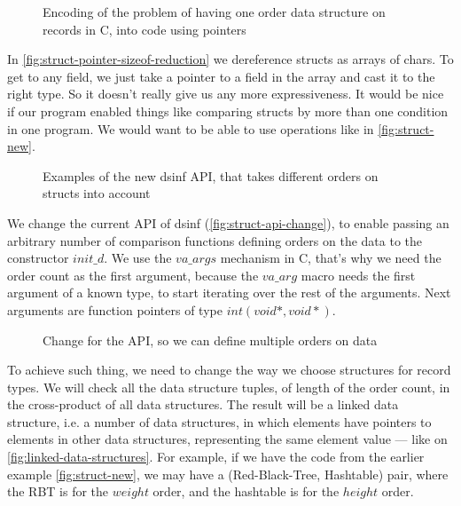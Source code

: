 \documentclass[a4paper,11pt]{article}
\begin{document}
            \begin{figure}[h!]
				

				\caption{Encoding of the problem of having one order data structure on records in C,
				into code using pointers}

				\label{fig:struct-pointer-sizeof-reduction}
			\end{figure}

			In \autoref{fig:struct-pointer-sizeof-reduction} we dereference structs as arrays of
			chars. To get to any field, we just take a pointer to a field in the array and cast it to the
			right type. So it doesn't really give us any more expressiveness. It would be nice if our
			program enabled things like comparing structs by more than one condition in one program. We
			would want to be able to use operations like in \autoref{fig:struct-new}.

            \begin{figure}[h!]
				

				\caption{Examples of the new dsinf API, that takes different orders on structs into
				account}

				\label{fig:struct-new}
			\end{figure}

            We change the current API of dsinf (\autoref{fig:struct-api-change}), to enable passing an arbitrary number
            of comparison functions defining orders on the data to the constructor $init\_d$. We use the $va\_args$
            mechanism in C, that's why we need the order count as the first argument, because the $va\_arg$ macro needs
            the first argument of a known type, to start iterating over the rest of the arguments. Next arguments are
            function pointers of type $int(void *, void *)$.

            \begin{figure}[h!]
				

				\caption{Change for the API, so we can define multiple orders on data}

				\label{fig:struct-api-change}
			\end{figure}

            To achieve such thing, we need to change the way we choose structures for record types. We will check all
            the data structure tuples, of length of the order count, in the cross-product of all data structures. The
            result will be a linked data structure, i.e. a number of data structures, in which elements have pointers to
            elements in other data structures, representing the same element value --- like on
            \autoref{fig:linked-data-structures}. For example, if we have the code from the earlier example
            \autoref{fig:struct-new}, we may have a (Red-Black-Tree, Hashtable) pair, where the RBT is for the $weight$
            order, and the hashtable is for the $height$ order.
\end{document}
